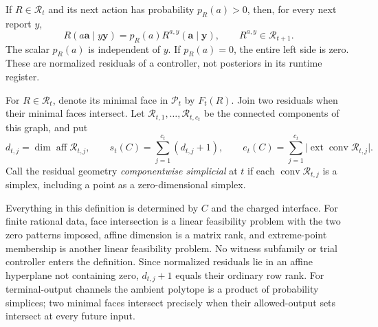 If $R\in\mathscr R_t$ and its next action has probability $p_R(a)>0$,
then, for every next report $y$,
\begin{equation}\label{eq:residual-shift29}
 R(a\mathbf a\mid y\mathbf y)
       =p_R(a)R^{a,y}(\mathbf a\mid\mathbf y),
 \qquad R^{a,y}\in\mathscr R_{t+1}.
\end{equation}
The scalar $p_R(a)$ is independent of $y$. If $p_R(a)=0$, the entire
left side is zero. These are normalized residuals of a controller, not
posteriors in its runtime register.

\begin{definition}\label{def:csr29}
For $R\in\mathscr R_t$, denote its minimal face in $\mathscr P_t$ by
$F_t(R)$. Join two residuals when their minimal faces intersect. Let
$\mathscr R_{t,1},\ldots,\mathscr R_{t,c_t}$ be the connected components
of this graph, and put
\begin{equation}\label{eq:csr29}
 d_{t,j}=\dim\operatorname{aff}\mathscr R_{t,j},\qquad
 s_t(C)=\sum_{j=1}^{c_t}(d_{t,j}+1),\qquad
 e_t(C)=\sum_{j=1}^{c_t}
       \bigl|\operatorname{ext}\operatorname{conv}\mathscr R_{t,j}\bigr|.
\end{equation}
Call the residual geometry \emph{componentwise simplicial} at $t$ if
each $\operatorname{conv}\mathscr R_{t,j}$ is a simplex, including a
point as a zero-dimensional simplex.
\end{definition}

Everything in this definition is determined by $C$ and the charged
interface. For finite rational data, face intersection is a linear
feasibility problem with the two zero patterns imposed, affine dimension
is a matrix rank, and extreme-point membership is another linear
feasibility problem. No witness subfamily or trial controller enters the
definition. Since normalized residuals lie in an affine hyperplane not
containing zero, $d_{t,j}+1$ equals their ordinary row rank.
For terminal-output channels the ambient polytope is a product of
probability simplices; two minimal faces intersect precisely when their
allowed-output sets intersect at every future input.

